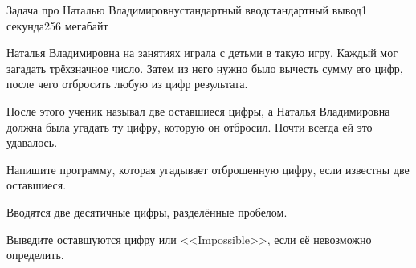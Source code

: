 \begin{problem}{Задача про Наталью Владимировну}{стандартный ввод}{стандартный вывод}{1 секунда}{256 мегабайт}

Наталья Владимировна на занятиях играла с детьми в такую игру. Каждый мог загадать трёхзначное число. Затем из него нужно было вычесть сумму его цифр, после чего отбросить любую из цифр результата.

После этого ученик называл две оставшиеся цифры, а Наталья Владимировна должна была угадать ту цифру, которую он отбросил. Почти всегда ей это удавалось.

Напишите программу, которая угадывает отброшенную цифру, если известны две оставшиеся.


\InputFile
Вводятся две десятичные цифры, разделённые пробелом.

\OutputFile
Выведите оставшуются цифру или <<Impossible>>, если её невозможно определить.

\Example

\begin{example}
%
\end{example}

\end{problem}

